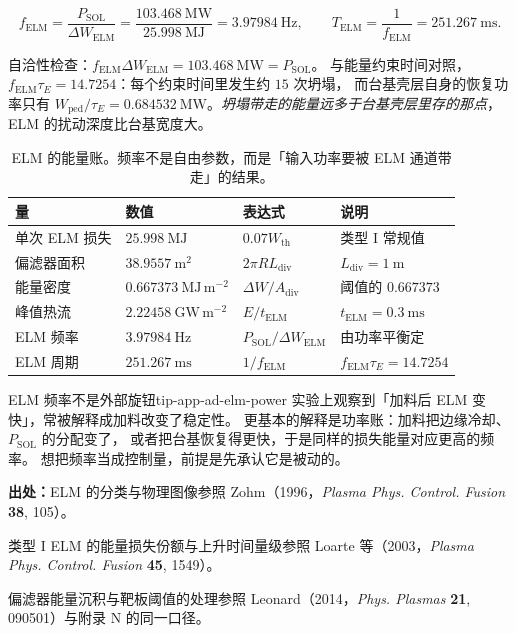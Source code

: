 \begin{equation}
f_{\mathrm{ELM}}=\frac{P_{\mathrm{SOL}}}{\Delta W_{\mathrm{ELM}}}
=\frac{103.468\ \mathrm{MW}}{25.998\ \mathrm{MJ}}=3.97984\ \mathrm{Hz},
\qquad
T_{\mathrm{ELM}}=\frac{1}{f_{\mathrm{ELM}}}=251.267\ \mathrm{ms}.
\label{eq:app-ad-felm}
\end{equation}

自洽性检查：$f_{\mathrm{ELM}}\Delta W_{\mathrm{ELM}}=103.468\ \mathrm{MW}=P_{\mathrm{SOL}}$。
与能量约束时间对照，$f_{\mathrm{ELM}}\tau_E=14.7254$：每个约束时间里发生约 $15$ 次坍塌，
而台基壳层自身的恢复功率只有 $W_{\mathrm{ped}}/\tau_E=0.684532\ \mathrm{MW}$。\emph{坍塌带走的能量远多于台基壳层里存的那点}，ELM 的扰动深度比台基宽度大。

\begin{table}[htbp]
\centering
\small
\caption{ELM 的能量账。频率不是自由参数，而是「输入功率要被 ELM 通道带走」的结果。}
\label{tab:app-ad-elm}
\begin{tabular}{p{3.6cm}p{3.3cm}p{4.0cm}p{4.0cm}}
\toprule
量 & 数值 & 表达式 & 说明 \\
\midrule
单次 ELM 损失 & $25.998\ \mathrm{MJ}$ & $0.07W_{\mathrm{th}}$ & 类型 I 常规值 \\
偏滤器面积 & $38.9557\ \mathrm{m^2}$ & $2\pi RL_{\mathrm{div}}$ & $L_{\mathrm{div}}=1\ \mathrm{m}$ \\
能量密度 & $0.667373\ \mathrm{MJ\,m^{-2}}$ & $\Delta W/A_{\mathrm{div}}$ & 阈值的 $0.667373$ \\
峰值热流 & $2.22458\ \mathrm{GW\,m^{-2}}$ & $E/t_{\mathrm{ELM}}$ & $t_{\mathrm{ELM}}=0.3\ \mathrm{ms}$ \\
ELM 频率 & $3.97984\ \mathrm{Hz}$ & $P_{\mathrm{SOL}}/\Delta W_{\mathrm{ELM}}$ & 由功率平衡定 \\
ELM 周期 & $251.267\ \mathrm{ms}$ & $1/f_{\mathrm{ELM}}$ & $f_{\mathrm{ELM}}\tau_E=14.7254$ \\
\bottomrule
\end{tabular}

\end{table}

\begin{tip}{ELM 频率不是外部旋钮}{tip-app-ad-elm-power}
实验上观察到「加料后 ELM 变快」，常被解释成加料改变了稳定性。
更基本的解释是功率账：加料把边缘冷却、$P_{\mathrm{SOL}}$ 的分配变了，
或者把台基恢复得更快，于是同样的损失能量对应更高的频率。
想把频率当成控制量，前提是先承认它是被动的。
\end{tip}

{\footnotesize
\textbf{出处：}ELM 的分类与物理图像参照 Zohm（1996，\emph{Plasma Phys. Control. Fusion} \textbf{38}, 105）。

类型 I ELM 的能量损失份额与上升时间量级参照 Loarte 等（2003，\emph{Plasma Phys. Control. Fusion} \textbf{45}, 1549）。

偏滤器能量沉积与靶板阈值的处理参照 Leonard（2014，\emph{Phys. Plasmas} \textbf{21}, 090501）与附录 N 的同一口径。
}

